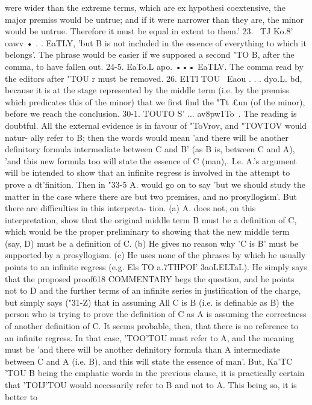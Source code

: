 {{{{{{{{{{{{{{{{{{{{{{{{were wider than the extreme terms, which are ex hypothesi
coextensive, the major premiss would be untrue; and if it were
narrower than they are, the minor would be untrue. Therefore
it must be equal in extent to them.'
23. ~TJ Ko.8' oawv • . . EaTLY, 'but B is not included in the
essence of everything to which it belongs'. The phrase would be
easier if we supposed a second "TO B, after the comma, to have
fallen out.
24-5. EaTo.L apo. ••• EaTLV. The comma read by the editors
after "TOU r must be removed.
26. E1Tl TOU ~Eaou . . . dyo.L. bd, because it is at the stage
represented by the middle term (i.e. by the premiss which
predicates this of the minor) that we first find the "Tt £un (of the
minor), before we reach the conclusion.
30-1. TOUTO S' ... av8pw1To~. The reading is doubtful. All the
external evidence is in favour of "ToVrov, and "TOVTOV would natur-
ally refer to B; then the words would mean 'and there will be
another definitory formula intermediate between C and B' (as
B is, between C and A), 'and this new formula too will state the
essence of C (man),. I.e. A.'s argument will be intended to
show that an infinite regress is involved in the attempt to prove
a dt'finition. Then in "33-5 A. would go on to say 'but we should
study the matter in the case where there are but two premises,
and no prosyllogism'. But there are difficulties in this interpreta-
tion. (a) A. does not, on this interpretation, show that the
original middle term B must be a definition of C, which would be
the proper preliminary to showing that the new middle term
(say, D) must be a definition of C. (b) He gives no reason why 'C
is B' must be supported by a prosyllogism. (c) He uses none of
the phrases by which he usually points to an infinite regress (e.g.
Els TO a.7THPOI' {3aoLELTaL). He simply says that the proposed proof618
COMMENTARY
begs the question, and he points not to D and the further terms
of an infinite series in justification of the charge, but simply says
("31-Z) that in assuming All C is B (i.e. is definable as B) the
person who is trying to prove the definition of C as A is assuming
the correctness of another definition of C.
It seems probable, then, that there is no reference to an infinite
regress. In that case, 'TOO'TOU must refer to A, and the meaning
must be 'and there will be another definitory formula than A
intermediate between C and A (i.e. B), and this will state the
essence of man'. But, Ka'TC~ 'TOU B being the emphatic words in
the previous clause, it is practically certain that 'TOIJ'TOU would
necessarily refer to B and not to A. This being so, it is better to
}}}}}}}}}}}}}}}}}}}}}}}}}
